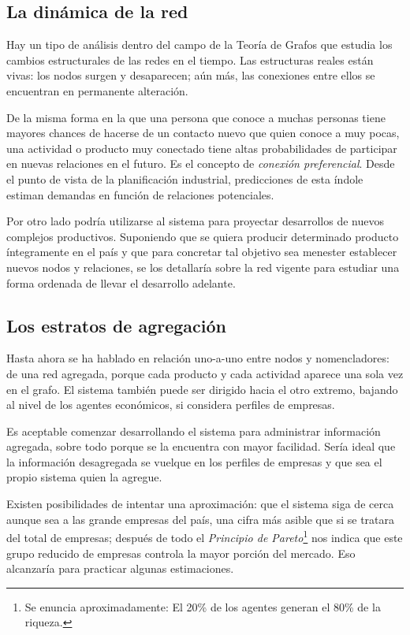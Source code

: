 \documentclass[a4paper]{report}
\begin{document}
\subsection*{La dinámica de la red}

Hay un tipo de análisis dentro del campo de la Teoría de Grafos que estudia los cambios estructurales de las redes en el tiempo. Las estructuras reales están vivas: los nodos surgen y desaparecen; aún más, las conexiones entre ellos se encuentran en permanente alteración.

De la misma forma en la que una persona que conoce a muchas personas tiene mayores chances de hacerse de un contacto nuevo que quien conoce a muy pocas, una actividad o producto muy conectado tiene altas probabilidades de participar en nuevas relaciones en el futuro. Es el concepto de \textit{conexión preferencial}. Desde el punto de vista de la planificación industrial, predicciones de esta índole estiman demandas en función de relaciones potenciales.

Por otro lado podría utilizarse al sistema para proyectar desarrollos de nuevos complejos productivos. Suponiendo que se quiera producir determinado producto íntegramente en el país y que para concretar tal objetivo sea menester establecer nuevos nodos y relaciones, se los detallaría sobre la red vigente para estudiar una forma ordenada de llevar el desarrollo adelante.

\subsection*{Los estratos de agregación}

Hasta ahora se ha hablado en relación uno-a-uno entre nodos y nomencladores: de una red agregada, porque cada producto y cada actividad aparece una sola vez en el grafo. El sistema también puede ser dirigido hacia el otro extremo, bajando al nivel de los agentes económicos, si considera perfiles de empresas.

Es aceptable comenzar desarrollando el sistema para administrar información agregada, sobre todo porque se la encuentra con mayor facilidad. Sería ideal que la información desagregada se vuelque en los perfiles de empresas y que sea el propio sistema quien la agregue.

Existen posibilidades de intentar una aproximación: que el sistema siga de cerca aunque sea a las grande empresas del país, una cifra más asible que si se tratara del total de empresas; después de todo el \textit{Principio de Pareto}\footnote{Se enuncia aproximadamente: El 20\% de los agentes generan el 80\% de la riqueza.} nos indica que este grupo reducido de empresas controla la mayor porción del mercado. Eso alcanzaría para practicar algunas estimaciones.
\end{document}
